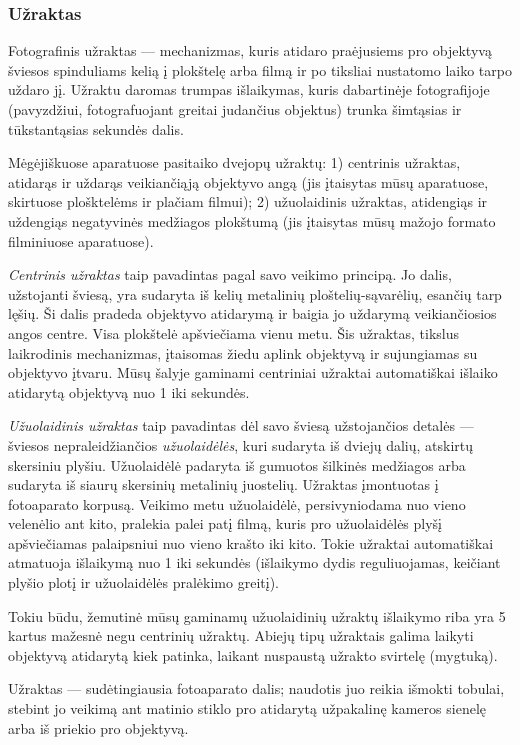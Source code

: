 \documentclass{book}
\begin{document}
				\subsubsection*{Užraktas}
					Fotografinis užraktas --- mechanizmas, kuris atidaro praėjusiems pro objektyvą šviesos spinduliams kelią į plokštelę arba filmą ir po tiksliai nustatomo laiko tarpo uždaro jį. Užraktu daromas trumpas išlaikymas, kuris dabartinėje fotografijoje (pavyzdžiui, fotografuojant greitai judančius objektus) trunka šimtąsias ir tūkstantąsias sekundės dalis.

					Mėgėjiškuose aparatuose pasitaiko dvejopų užraktų: 1) centrinis užraktas, atidarąs ir uždarąs veikiančiąją objektyvo angą (jis įtaisytas mūsų aparatuose, skirtuose plošktelėms ir plačiam filmui); 2) užuolaidinis užraktas, atidengiąs ir uždengiąs negatyvinės medžiagos plokštumą (jis įtaisytas mūsų mažojo formato filminiuose aparatuose).

					\textit{Centrinis užraktas} taip pavadintas pagal savo veikimo principą. Jo dalis, užstojanti šviesą, yra sudaryta iš kelių metalinių ploštelių-sąvarėlių, esančių tarp lęšių. Ši dalis pradeda objektyvo atidarymą ir baigia jo uždarymą veikiančiosios angos centre. Visa plokštelė apšviečiama vienu metu. Šis užraktas, tikslus laikrodinis mechanizmas, įtaisomas žiedu aplink objektyvą ir sujungiamas su objektyvo įtvaru. Mūsų šalyje gaminami centriniai užraktai automatiškai išlaiko atidarytą objektyvą nuo 1 iki  sekundės.

					\textit{Užuolaidinis užraktas} taip pavadintas dėl savo šviesą užstojančios detalės --- šviesos nepraleidžiančios \textit{užuolaidėlės}, kuri sudaryta iš dviejų dalių, atskirtų skersiniu plyšiu. Užuolaidėlė padaryta iš gumuotos šilkinės medžiagos arba sudaryta iš siaurų skersinių metalinių juostelių. Užraktas įmontuotas į fotoaparato korpusą. Veikimo metu užuolaidėlė, persivyniodama nuo vieno velenėlio ant kito, pralekia palei patį filmą, kuris pro užuolaidėlės plyšį apšviečiamas palaipsniui nuo vieno krašto iki kito. Tokie užraktai automatiškai atmatuoja išlaikymą nuo 1 iki  sekundės (išlaikymo dydis reguliuojamas, keičiant plyšio plotį ir užuolaidėlės pralėkimo greitį).

					Tokiu būdu, žemutinė mūsų gaminamų užuolaidinių užraktų išlaikymo riba yra 5 kartus mažesnė negu centrinių užraktų. Abiejų tipų užraktais galima laikyti objektyvą atidarytą kiek patinka, laikant nuspaustą užrakto svirtelę (mygtuką).

					Užraktas --- sudėtingiausia fotoaparato dalis; naudotis juo reikia išmokti tobulai, stebint jo veikimą ant matinio stiklo pro atidarytą užpakalinę kameros sienelę arba iš priekio pro objektyvą.
\end{document}

